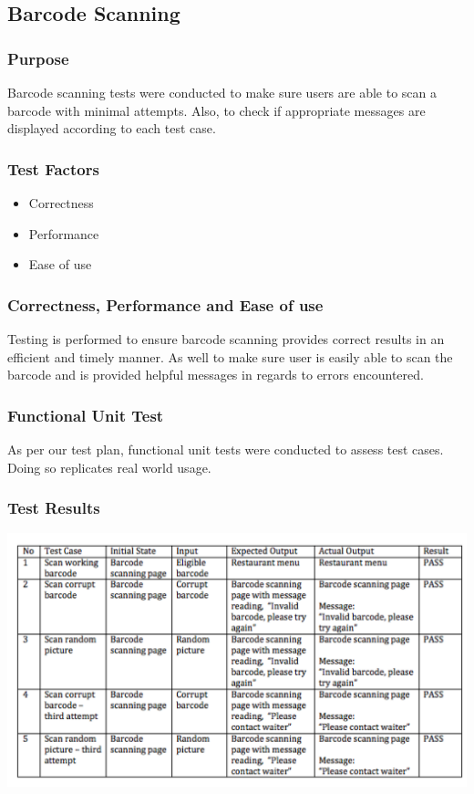\documentclass[12pt, titlepage]{article}
\begin{document}
\subsection{Barcode Scanning}

\subsubsection{Purpose}
Barcode scanning tests were conducted to make sure users are able to scan a barcode with minimal attempts. Also, to check if appropriate messages are displayed according to each test case.

\subsubsection{Test Factors}
\begin{itemize}
 \item Correctness
 \item Performance
 \item Ease of use
 \end{itemize}

\subsubsection{Correctness, Performance and Ease of use}
Testing is performed to ensure barcode scanning provides correct results in an efficient and timely manner. As well to make sure user is easily able to scan the barcode and is provided helpful messages in regards to errors encountered.

\subsubsection{Functional Unit Test}
As per our test plan, functional unit tests were  conducted to assess test cases. Doing so replicates real world usage.

\subsubsection{Test Results}
\includegraphics[width=1.2\textwidth]{barcodeTable.png}
\end{document}

